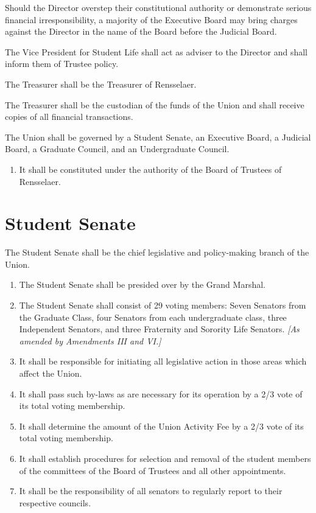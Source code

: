 \documentclass{uniondoc}
\begin{document}
Should the Director overstep their constitutional authority or demonstrate serious financial irresponsibility, a majority of the Executive Board may bring charges against the Director in the name of the Board before the Judicial Board.

The Vice President for Student Life shall act as adviser to the Director and shall inform them of Trustee policy.


The Treasurer shall be the Treasurer of Rensselaer.

The Treasurer shall be the custodian of the funds of the Union and shall receive copies of all financial transactions.


The Union shall be governed by a Student Senate, an Executive Board, a Judicial Board, a Graduate Council, and an Undergraduate Council.

\begin{enumerate}
\item It shall be constituted under the authority of the Board of Trustees of Rensselaer.
\end{enumerate}

\section{Student Senate}

The Student Senate shall be the chief legislative and policy-making branch of the Union.

\begin{enumerate}
\item The Student Senate shall be presided over by the Grand Marshal.
\item The Student Senate shall consist of 29 voting members: Seven Senators from the Graduate Class, four Senators from each undergraduate class, three Independent Senators, and three Fraternity and Sorority Life Senators. \textit{[As amended by Amendments III and VI.]}
\item It shall be responsible for initiating all legislative action in those areas which affect the Union.
\item It shall pass such by-laws as are necessary for its operation by a 2/3 vote of its total voting membership.
\item It shall determine the amount of the Union Activity Fee by a 2/3 vote of its total voting membership.
\item It shall establish procedures for selection and removal of the student members of the committees of the Board of Trustees and all other appointments.
\item It shall be the responsibility of all senators to regularly report to their respective councils.
\end{enumerate}
\end{document}
